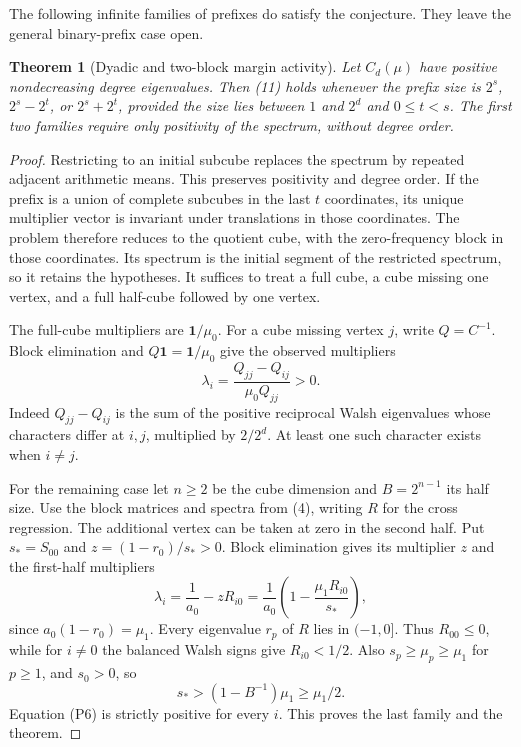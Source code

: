 \documentclass[11pt]{article}
\newtheorem{theorem}{Theorem}\newtheorem{lemma}[theorem]{Lemma}
\newcommand{\one}{\mathbf1}
\begin{document}
The following infinite families of prefixes do satisfy the conjecture.
They leave the general binary-prefix case open.
\begin{theorem}[Dyadic and two-block margin activity]
Let $C_d(\mu)$ have positive nondecreasing degree eigenvalues.
Then (11) holds whenever the prefix size is $2^s$, $2^s-2^t$,
or $2^s+2^t$, provided the size lies between $1$ and $2^d$ and
$0\le t<s$. The first two families require only positivity of the
spectrum, without degree order.
\end{theorem}
\begin{proof}
Restricting to an initial subcube replaces the spectrum by repeated
adjacent arithmetic means. This preserves positivity and degree order.
If the prefix is a union of complete subcubes in the last $t$ coordinates,
its unique multiplier vector is invariant under translations in those
coordinates. The problem therefore reduces to the quotient cube, with
the zero-frequency block in those coordinates. Its spectrum is the
initial segment of the restricted spectrum, so it retains the hypotheses.
It suffices to treat a full cube, a cube missing one vertex, and a full
half-cube followed by one vertex.

The full-cube multipliers are $\one/\mu_0$.
For a cube missing vertex $j$, write $Q=C^{-1}$. Block elimination and
$Q\one=\one/\mu_0$ give the observed multipliers
\[
             \lambda_i=\frac{Q_{jj}-Q_{ij}}{\mu_0Q_{jj}}>0.
                                                               \tag{P5}
\]
Indeed $Q_{jj}-Q_{ij}$ is the sum of the positive reciprocal Walsh
eigenvalues whose characters differ at $i,j$, multiplied by $2/2^d$.
At least one such character exists when $i\ne j$.

For the remaining case let $n\ge2$ be the cube dimension and
$B=2^{n-1}$ its half size. Use the block matrices and spectra from (4),
writing $R$ for the cross regression. The additional vertex can be
taken at zero in the second half. Put $s_* = S_{00}$ and
$z=(1-r_0)/s_*>0$. Block elimination gives its multiplier $z$ and
the first-half multipliers
\[
             \lambda_i=\frac1{a_0}-zR_{i0}
                     =\frac1{a_0}\left(1-
                                      \frac{\mu_1R_{i0}}{s_*}\right),
                                                               \tag{P6}
\]
since $a_0(1-r_0)=\mu_1$.
Every eigenvalue $r_p$ of $R$ lies in $(-1,0]$.
Thus $R_{00}\le0$, while for $i\ne0$ the balanced Walsh signs give
$R_{i0}<1/2$. Also $s_p\ge\mu_p\ge\mu_1$ for $p\ge1$, and
$s_0>0$, so
\[
                    s_* > (1-B^{-1})\mu_1\ge\mu_1/2.
\]
Equation (P6) is strictly positive for every $i$.
This proves the last family and the theorem.
\end{proof}
\end{document}

